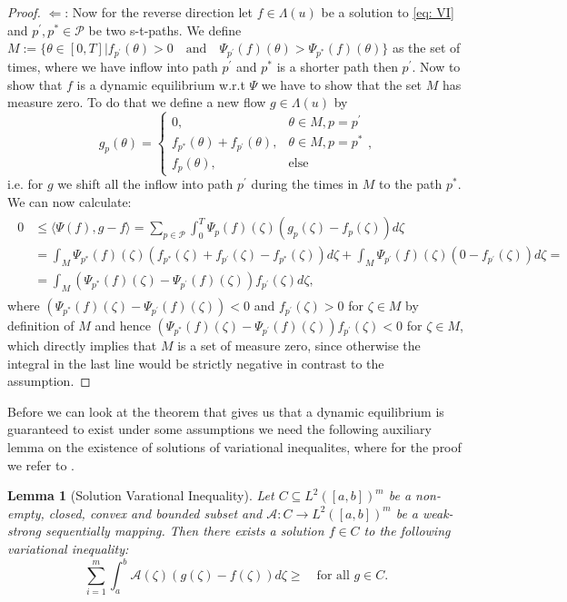 \documentclass[reqno,openany]{amsbook}
\theoremstyle{definition}
\theoremstyle{plain}
\newtheorem{lemma}[definition]{Lemma}
\begin{document}
\begin{proof}
$\Leftarrow$: Now for the reverse direction let $f \in \Lambda(u)$ be a solution to \eqref{eq: VI} and $p^{\prime}, p^* \in \mathcal{P}$ be two s-t-paths. We define $M := \{ \theta \in [0, T] \vert f_{p^{\prime}}(\theta) > 0 \quad \text{and} \quad \Psi_{p^{\prime}}(f)(\theta) > \Psi_{p^*}(f)(\theta) \}$ as the set of times, where we have inflow into path $p^{\prime}$ and $p^*$ is a shorter path then $p^{\prime}$. Now to show that $f$ is a dynamic equilibrium w.r.t $\Psi$ we have to show that the set $M$ has measure zero. To do that we define a new flow $g \in \Lambda(u)$ by 
\[ g_p(\theta) = \begin{cases} 0,& \theta \in M, p = p^{\prime} \\ f_{p^*}(\theta) + f_{p^{\prime}}(\theta),& \theta \in M, p = p^* \\ f_p(\theta),& \text{else} \end{cases}, \]
i.e. for $g$ we shift all the inflow into path $p^{\prime}$ during the times in $M$ to the path $p^*$. We can now calculate:
\begin{align*}
	\begin{split}
		0 &\leq \langle \Psi(f), g - f \rangle = \sum_{p \in \mathcal{P}} \int_0^T \Psi_p(f)(\zeta)(g_p(\zeta) - f_p(\zeta)) d\zeta \\
		&= \int_M \Psi_{p^*}(f)(\zeta)(f_{p^*}(\zeta) + f_{p^{\prime}}(\zeta) - f_{p^*}(\zeta)) d\zeta + \int_M 
		\Psi_{p^{\prime}}(f)(\zeta)(0 - f_{p^{\prime}}(\zeta)) d\zeta =\\
		&= \int_M (\Psi_{p^*}(f)(\zeta) - \Psi_{p^{\prime}}(f)(\zeta))f_{p^{\prime}}(\zeta) d\zeta, 
	\end{split}
\end{align*}
where $(\Psi_{p^*}(f)(\zeta) - \Psi_{p^{\prime}}(f)(\zeta)) < 0$ and $f_{p^{\prime}}(\zeta) > 0$ for $\zeta \in M$ by definition of $M$ and hence $(\Psi_{p^*}(f)(\zeta) - \Psi_{p^{\prime}}(f)(\zeta))f_{p^{\prime}}(\zeta) < 0$ for $\zeta \in M$, which directly implies that $M$ is a set of measure zero, since otherwise the integral in the last line would be strictly negative in contrast to the assumption.
\end{proof}
Before we can look at the theorem that gives us that a dynamic equilibrium is guaranteed to exist under some assumptions we need the following auxiliary lemma on the existence of solutions of variational inequalites, where for the proof we refer to \cite{JL}.

\newpage

\begin{lemma}[Solution Varational Inequality]\label{lemma: SolutionVI}
Let $C \subseteq L^2([a, b])^m$ be a non-empty, closed, convex and bounded subset and $\mathcal{A}: C \to L^2([a, b])^m$ be a weak-strong sequentially mapping. Then there exists a solution $f \in C$ to the following variational inequality:
\[\sum_{i = 1}^m \int_a^b \mathcal{A}(\zeta)(g(\zeta) - f(\zeta)) d\zeta \geq \quad \text{for all $g \in C$}.\]
\end{lemma}
\end{document}
